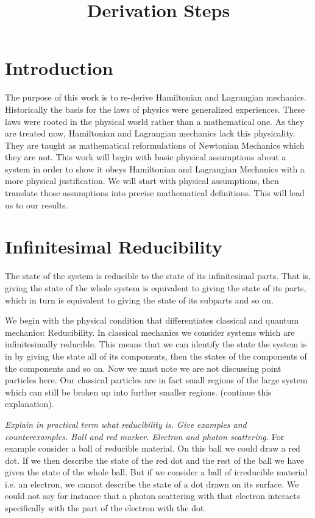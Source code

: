 \documentclass{article}
\begin{document}
\title{Derivation Steps}

\section{Introduction}

	The purpose of this work is to re-derive Hamiltonian and Lagrangian mechanics. Historically the basis for the laws of physics were generalized experiences. These laws were rooted in the physical world rather than a mathematical one. As they are treated now, Hamiltonian and Lagrangian mechanics lack this physicality. They are taught as mathematical reformulations of Newtonian Mechanics which they are not. This work will begin with basic physical assumptions about a system in order to show it obeys Hamiltonian and Lagrangian Mechanics with a more physical justification. We will start with physical assumptions, then translate those assumptions into precise mathematical definitions. This will lead us to our results.

\section{Infinitesimal Reducibility}
	
\begin{assump}
	The state of the system is reducible to the state of its infinitesimal parts. That is, giving the state of the whole system is equivalent to giving the state of its parts, which in turn is equivalent to giving the state of its subparts and so on.
\end{assump}

	We begin with the physical condition that differentiates classical and quantum mechanics: Reducibility. In classical mechanics we consider systems which are infinitesimally reducible. This means that we can identify the state the system is in by giving the state all of its components, then the states of the components of the components and so on. Now we must note we are not discussing point particles here. Our classical particles are in fact small regions of the large system which can still be broken up into further smaller regions. (continue this explanation).
	
	\emph{Explain in practical term what reducibility is. Give examples and counterexamples. Ball and red marker. Electron and photon scattering.} For example consider a ball of reducible material. On this ball we could draw a red dot. If we then describe the state of the red dot and the rest of the ball we have given the state of the whole ball. But if we consider a ball of irreducible material i.e. an electron, we cannot describe the state of a dot drawn on its surface. We could not say for instance that a photon scattering with that electron interacts specifically with the part of the electron with the dot.
	
\end{document}
